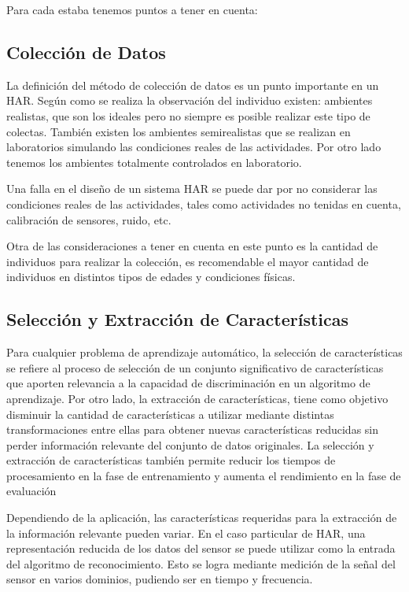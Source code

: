 Para cada estaba tenemos puntos a tener en cuenta:

\subsection{Colección de Datos}
La definición del método de colección de datos es un punto importante en un HAR. Según como se realiza la observación del individuo existen: ambientes realistas, que son los ideales pero no siempre es posible realizar este tipo de colectas. También existen los ambientes semirealistas que se realizan en laboratorios simulando las condiciones reales de las actividades. Por otro lado tenemos los ambientes totalmente controlados en laboratorio.

Una falla en el diseño de un sistema HAR se puede dar por no considerar las condiciones reales de las actividades, tales como actividades no tenidas en cuenta, calibración de sensores, ruido, etc.

Otra de las consideraciones a tener en cuenta en este punto es la cantidad de individuos para realizar la colección, es recomendable el mayor cantidad de individuos en distintos tipos de edades y condiciones físicas. 


\subsection{Selección y Extracción de Características}
Para cualquier problema de aprendizaje automático, la selección de características se refiere al proceso de selección de un conjunto significativo de características que aporten relevancia a la capacidad de discriminación en un algoritmo de aprendizaje. Por otro lado, la extracción de características, tiene como objetivo disminuir la cantidad de características a utilizar mediante distintas transformaciones entre ellas para obtener nuevas características reducidas sin perder información relevante del conjunto de datos originales. La selección y extracción de características también permite reducir los tiempos de procesamiento en la fase de entrenamiento y aumenta el rendimiento en la fase de evaluación 

Dependiendo de la aplicación, las características requeridas para la extracción de la información relevante pueden variar. En el caso particular de HAR, una representación reducida de los datos del sensor se puede utilizar como la entrada del algoritmo de reconocimiento. Esto se logra mediante medición de la señal del sensor en varios dominios, pudiendo ser en tiempo y frecuencia.

